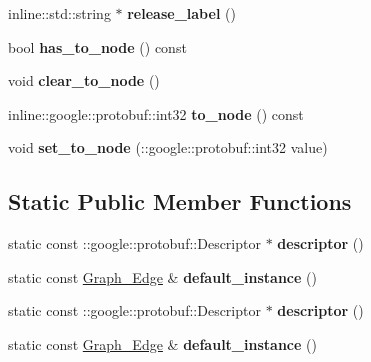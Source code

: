 \begin{DoxyCompactItemize}
\item 
\hypertarget{classgraph_1_1Graph__Edge_a932083f61d90db20cf811adaf02503fd}{
inline::std::string $\ast$ {\bfseries release\_\-label} ()}
\label{classgraph_1_1Graph__Edge_a932083f61d90db20cf811adaf02503fd}

\item 
\hypertarget{classgraph_1_1Graph__Edge_af80c945f9d34527de487207bc9553776}{
bool {\bfseries has\_\-to\_\-node} () const }
\label{classgraph_1_1Graph__Edge_af80c945f9d34527de487207bc9553776}

\item 
\hypertarget{classgraph_1_1Graph__Edge_a10c4766efe37b9ebf33d94e58f5d34d1}{
void {\bfseries clear\_\-to\_\-node} ()}
\label{classgraph_1_1Graph__Edge_a10c4766efe37b9ebf33d94e58f5d34d1}

\item 
\hypertarget{classgraph_1_1Graph__Edge_ae2c9acb9f4e76e8228947b44eba690f9}{
inline::google::protobuf::int32 {\bfseries to\_\-node} () const }
\label{classgraph_1_1Graph__Edge_ae2c9acb9f4e76e8228947b44eba690f9}

\item 
\hypertarget{classgraph_1_1Graph__Edge_a61b1469e26d71c6b2673a6a3da5a057f}{
void {\bfseries set\_\-to\_\-node} (::google::protobuf::int32 value)}
\label{classgraph_1_1Graph__Edge_a61b1469e26d71c6b2673a6a3da5a057f}

\end{DoxyCompactItemize}
\subsection*{Static Public Member Functions}
\begin{DoxyCompactItemize}
\item 
\hypertarget{classgraph_1_1Graph__Edge_a3123a39b6f9e2e2fac9035944ce1d589}{
static const ::google::protobuf::Descriptor $\ast$ {\bfseries descriptor} ()}
\label{classgraph_1_1Graph__Edge_a3123a39b6f9e2e2fac9035944ce1d589}

\item 
\hypertarget{classgraph_1_1Graph__Edge_a14f42efa9ab2cf6559077dd0fdd05f34}{
static const \hyperlink{classgraph_1_1Graph__Edge}{Graph\_\-Edge} \& {\bfseries default\_\-instance} ()}
\label{classgraph_1_1Graph__Edge_a14f42efa9ab2cf6559077dd0fdd05f34}

\item 
\hypertarget{classgraph_1_1Graph__Edge_a3123a39b6f9e2e2fac9035944ce1d589}{
static const ::google::protobuf::Descriptor $\ast$ {\bfseries descriptor} ()}
\label{classgraph_1_1Graph__Edge_a3123a39b6f9e2e2fac9035944ce1d589}

\item 
\hypertarget{classgraph_1_1Graph__Edge_a14f42efa9ab2cf6559077dd0fdd05f34}{
static const \hyperlink{classgraph_1_1Graph__Edge}{Graph\_\-Edge} \& {\bfseries default\_\-instance} ()}
\label{classgraph_1_1Graph__Edge_a14f42efa9ab2cf6559077dd0fdd05f34}

\end{DoxyCompactItemize}
